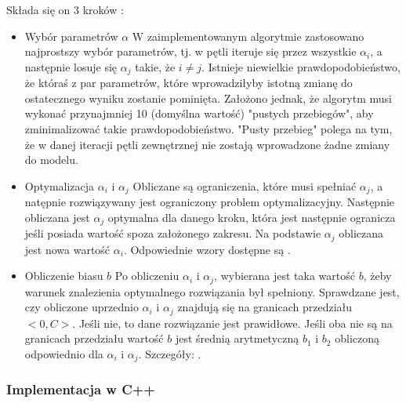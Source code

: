\documentclass[[10pt,a4paper]{article}
\begin{document}
Składa się on 3 kroków \cite{svmsmo}:
\begin{itemize}
	\item Wybór parametrów $\alpha$
	W zaimplementowanym algorytmie zastosowano najprostszy wybór parametrów, tj. w pętli iteruje się przez wszystkie $\alpha_i$, a następnie losuje się $\alpha_j$ takie, że $i \neq j$. Istnieje niewielkie prawdopodobieństwo, że któraś z par parametrów, które wprowadziłyby istotną zmianę do ostatecznego wyniku zostanie pominięta. Założono jednak, że algorytm musi wykonać przynajmniej 10 (domyślna wartość) "pustych przebiegów", aby zminimalizować takie prawdopodobieństwo. "Pusty przebieg" polega na tym, że w danej iteracji pętli zewnętrznej nie zostają wprowadzone żadne zmiany do modelu.
	\item Optymalizacja $\alpha_i$ i $\alpha_j$
	Obliczane są ograniczenia, które musi spełniać $\alpha_j$, a natępnie rozwiązywany jest ograniczony problem optymalizacyjny. Następnie obliczana jest $\alpha_j$ optymalna dla danego kroku, która jest następnie ogranicza jeśli posiada wartość spoza założonego zakresu. Na podstawie $\alpha_j$ obliczana jest nowa wartość $\alpha_i$. Odpowiednie wzory dostępne są \cite{svmsmo}.
	\item Obliczenie biasu $b$
	Po obliczeniu $\alpha_i$ i $\alpha_j$, wybierana jest taka wartość $b$, żeby warunek znalezienia optymalnego rozwiązania był spełniony. Sprawdzane jest, czy obliczone uprzednio $\alpha_i$ i $\alpha_j$ znajdują się na granicach przedziału $<0,C>$. Jeśli nie, to dane rozwiązanie jest prawidłowe. Jeśli oba nie są na granicach przedziału wartość $b$ jest średnią arytmetyczną $b_1$ i $b_2$ obliczoną odpowiednio dla $\alpha_i$ i $\alpha_j$. Szczegóły: \cite{svmsmo}.
\end{itemize}
\subsubsection{Implementacja w C++}
\end{document}
